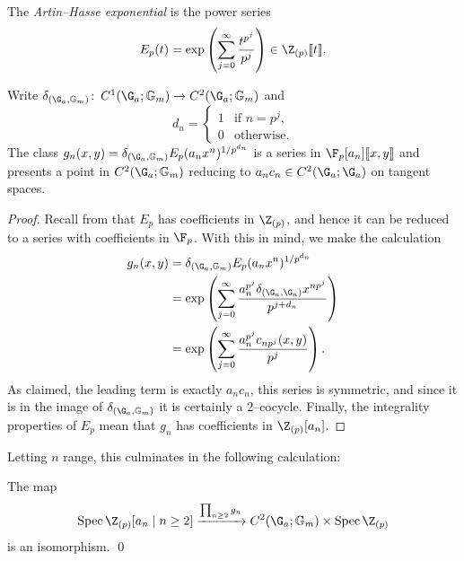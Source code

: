 \begin{definition}
The \textit{Artin--Hasse exponential} is the power series \[E_p(t) = \exp\left( \sum_{j=0}^\infty \frac{t^{p^j}}{p^j} \right) \in \Z_{(p)}\ps{t}.\]
\end{definition}

\begin{lemma}
Write $\delta_{(\G_a, \Gm)}\co C^1(\G_a; \Gm) \to C^2(\G_a; \Gm)$ and \[d_n = \begin{cases} 1 & \text{if $n = p^j$}, \\ 0 & \text{otherwise}. \end{cases}\]  The class $g_n(x, y) = \delta_{(\G_a,\Gm)} E_p(a_n x^n)^{1/p^{d_n}}$ is a series in $\F_p[a_n]\ps{x,y}$ and presents a point in $C^2(\G_a; \Gm)$ reducing to $a_n c_n \in C^2(\G_a; \G_a)$ on tangent spaces.
\end{lemma}
\begin{proof}
Recall from  that $E_p$ has coefficients in $\Z_{(p)}$, and hence it can be reduced to a series with coefficients in $\F_p$.   With this in mind, we make the calculation
\begin{align*}
g_n(x, y) & = \delta_{(\G_a, \Gm)} E_p(a_n x^n)^{1/p^{d_n}} \\
& = \exp\left( \sum_{j=0}^\infty \frac{a_n^{p^j} \delta_{(\G_a, \G_a)} x^{np^j}}{p^{j + d_n}} \right) \\
& = \exp\left( \sum_{j=0}^\infty \frac{a_n^{p^j} c_{np^j}(x, y)}{p^j} \right).
\end{align*}
As claimed, the leading term is exactly $a_n c_n$, this series is symmetric, and since it is in the image of $\delta_{(\G_a, \Gm)}$ it is certainly a $2$--cocycle.  Finally, the integrality properties of $E_p$ mean that $g_n$ has coefficients in $\Z_{(p)}[a_n]$.
\end{proof}

Letting $n$ range, this culminates in the following calculation:

\begin{lemma}
The map \[\Spec \Z_{(p)}[a_n \mid n \ge 2] \xrightarrow{\prod_{n \ge 2} g_n} C^2(\G_a; \Gm) \times \Spec \Z_{(p)}\] is an isomorphism. \qed
\end{lemma}

